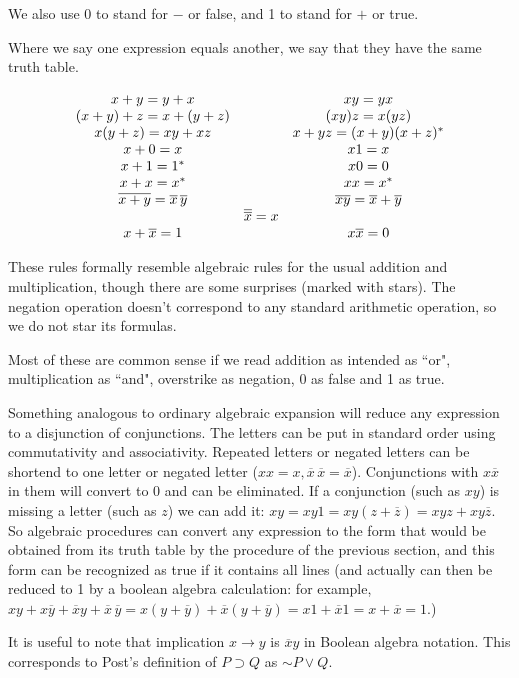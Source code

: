 \documentclass[12pt]{article}
\begin{document}
We also use 0 to stand for $-$ or false, and 1 to stand for $+$ or true.

Where we say one expression equals another, we say that they have the same truth table.

$$\begin{array}{c c c}
 x+y = y + x & & xy = yx \\

(x+y)+z = x+(y+z) & & (xy)z = x(yz) \\

x(y+z) = xy+xz &  & x+yz = (x+y)(x+z)^* \\

x+0 = x&   &x1 = x \\

x+1 = 1^*& & x0=0 \\

x+x = x^* &  &xx=x^* \\

\overline{x+y} = \overline x \,\overline y & & \overline{xy} = \overline x + \overline y \\

   & \overline{\overline{x}} = x & \\

x + \overline{x} = 1 &  &x\overline{x}=0 \\

\end{array}$$

These rules formally resemble algebraic rules for the usual addition and multiplication, though there are some surprises (marked with stars).
The negation operation doesn't correspond to any standard arithmetic operation, so we do not star its formulas.

Most of these are common sense if we read addition as intended as ``or", multiplication as ``and", overstrike as negation, 0 as false and 1 as true.

Something analogous to ordinary algebraic expansion will reduce any expression to a disjunction of conjunctions.   The letters can be put in standard order using
commutativity and associativity.  Repeated letters or negated letters can be shortend to one letter or negated letter ($xx=x, \overline x \,\overline x = \overline x$).  Conjunctions with $x\overline{x}$ in them will convert to 0 and can be eliminated.  If a conjunction (such as $xy$) is missing a letter
(such as $z$) we can add it:  $xy = xy1 = xy(z+\overline z) = xyz + xy\overline z$.  So algebraic procedures can convert any expression to the form
that would be obtained from its truth table by the procedure of the previous section, and this form can be recognized as true if it contains all lines (and actually can then be reduced to 1 by a boolean algebra calculation:  for example, $xy + x\overline y + \overline x y + \overline x\,\overline y = x(y + \overline y) + \overline x(y + \overline y) = x1 + \overline x 1 = x + \overline x = 1$.)

It is useful to note that implication $x \rightarrow y$ is $\overline xy$ in Boolean algebra notation.  This corresponds to Post's definition of $P \supset Q$ as
$\sim P \vee Q$.
\end{document}
